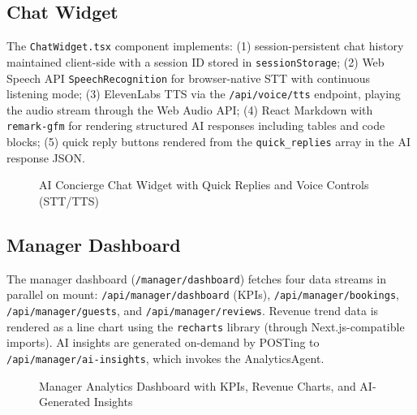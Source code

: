 \documentclass[11pt,a4paper]{report}
\begin{document}
\subsection{Chat Widget}

The \texttt{ChatWidget.tsx} component implements: (1) session-persistent chat history maintained client-side with a session ID stored in \texttt{sessionStorage}; (2) Web Speech API \texttt{SpeechRecognition} for browser-native STT with continuous listening mode; (3) ElevenLabs TTS via the \texttt{/api/voice/tts} endpoint, playing the audio stream through the Web Audio API; (4) React Markdown with \texttt{remark-gfm} for rendering structured AI responses including tables and code blocks; (5) quick reply buttons rendered from the \texttt{quick\_replies} array in the AI response JSON.

\begin{figure}[H]
\centering
\caption{AI Concierge Chat Widget with Quick Replies and Voice Controls (STT/TTS)}
\label{fig:chat_widget}
\end{figure}

\subsection{Manager Dashboard}

The manager dashboard (\texttt{/manager/dashboard}) fetches four data streams in parallel on mount: \texttt{/api/manager/dashboard} (KPIs), \texttt{/api/manager/bookings}, \texttt{/api/manager/guests}, and \texttt{/api/manager/reviews}. Revenue trend data is rendered as a line chart using the \texttt{recharts} library (through Next.js-compatible imports). AI insights are generated on-demand by POSTing to \texttt{/api/manager/ai-insights}, which invokes the AnalyticsAgent.

\begin{figure}[H]
\centering
\caption{Manager Analytics Dashboard with KPIs, Revenue Charts, and AI-Generated Insights}
\label{fig:dashboard}
\end{figure}
\end{document}
